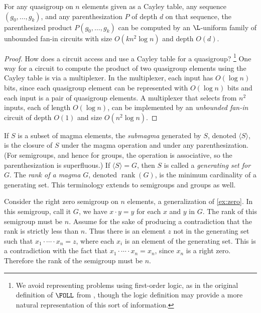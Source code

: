 \documentclass{article}
\newcommand{\gen}[1]{\langle #1 \rangle}
\DeclareMathOperator{\rank}{rank}
\begin{document}
\begin{lemma}\label{lem:product}
  For any quasigroup on $n$ elements given as a Cayley table, any sequence $(g_0, \dotsc, g_k)$, and any parenthesization $P$ of depth $d$ on that sequence, the parenthesized product $P(g_0, \dotsc, g_k)$ can be computed by an $\L$-uniform family of unbounded fan-in circuits with size $O(k n^2 \log n)$ and depth $O(d)$.
\end{lemma}
\begin{proof}
  How does a circuit access and use a Cayley table for a quasigroup?%
  \footnote{We avoid representing problems using first-order logic, as in the original definition of $\FOLL$ from \autocite{bklm01}, though the logic definition may provide a more natural representation of this sort of information.}
  One way for a circuit to compute the product of two quasigroup elements using the Cayley table is via a multiplexer.
  In the multiplexer, each input has $O(\log n)$ bits, since each quasigroup element can be represented with $O(\log n)$ bits and each input is a pair of quasigroup elements.
  A multiplexer that selects from $n^2$ inputs, each of length $O(\log n)$, can be implemented by an \emph{unbounded fan-in} circuit of depth $O(1)$ and size $O(n^2 \log n)$.
\end{proof}

If $S$ is a subset of magma elements, the \emph{submagma} generated by $S$, denoted $\gen{S}$, is the closure of $S$ under the magma operation and under any parenthesization.
(For semigroups, and hence for groups, the operation is associative, so the parenthesization is superfluous.)
If $\gen{S} = G$, then $S$ is called a \emph{generating set for $G$}.
The \emph{rank of a magma $G$}, denoted $\rank(G)$, is the minimum cardinality of a generating set.
This terminology extends to semigroups and groups as well.

\begin{example}\label{ex:semigroupgen}
  Consider the right zero semigroup on $n$ elements, a generalization of \autoref{ex:zero}.
  In this semigroup, call it $G$, we have $x \cdot y = y$ for each $x$ and $y$ in $G$.
  The rank of this semigroup must be $n$.
  Assume for the sake of producing a contradiction that the rank is strictly less than $n$.
  Thus there is an element $z$ not in the generating set such that $x_1 \cdot \dotsb \cdot x_n = z$, where each $x_i$ is an element of the generating set.
  This is a contradiction with the fact that $x_1 \cdot \dotsb \cdot x_n = x_n$, since $x_n$ is a right zero.
  Therefore the rank of the semigroup must be $n$.
\end{example}
\end{document}

